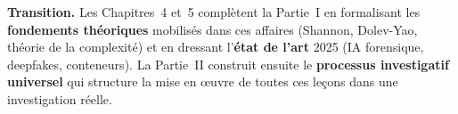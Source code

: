 \bigskip

\begin{boxinfo}
\textbf{Transition.} Les Chapitres~4 et~5 complètent la Partie~I en
formalisant les \textbf{fondements théoriques} mobilisés dans ces affaires
(Shannon, Dolev-Yao, théorie de la complexité) et en dressant l'\textbf{état
de l'art} 2025 (IA forensique, deepfakes, conteneurs). La Partie~II
construit ensuite le \textbf{processus investigatif universel} qui structure
la mise en œuvre de toutes ces leçons dans une investigation réelle.
\end{boxinfo}
